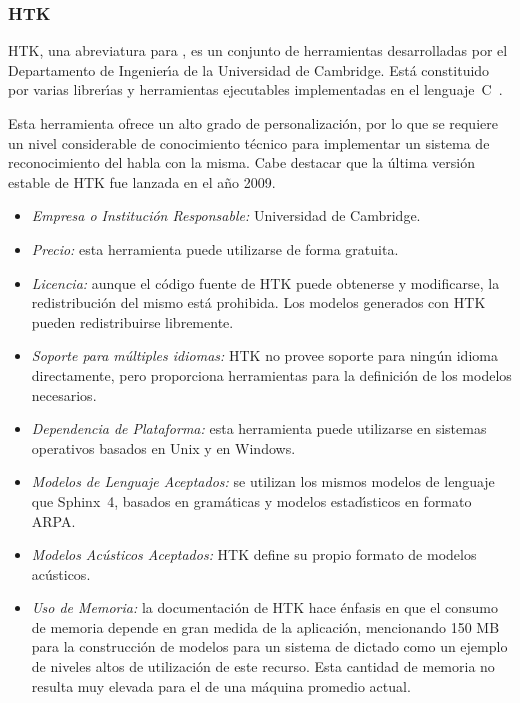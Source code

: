 \subsubsection{HTK}
\label{sec:htk}

HTK, una abreviatura para , es un conjunto de herramientas
desarrolladas por el Departamento de Ingenier{\'\i}a de la Universidad de Cambridge. Est\'a constituido
por varias librer{\'\i}as y herramientas ejecutables implementadas en el \mbox{lenguaje C \cite{HTKHomePage}}.

Esta herramienta ofrece un alto grado de personalizaci\'on, por lo que se requiere un nivel considerable
de conocimiento t\'ecnico para implementar un sistema de reconocimiento del habla con la misma.
Cabe destacar que la \'ultima versi\'on estable de HTK fue lanzada en el a\~no 2009.

\begin{itemize}
	\item \emph{Empresa o Instituci\'on Responsable:} Universidad de Cambridge.
	\item \emph{Precio:} esta herramienta puede utilizarse de forma gratuita.
	\item \emph{Licencia:} aunque el c\'odigo fuente de HTK puede obtenerse y modificarse,
	la redistribuci\'on del mismo est\'a prohibida. Los modelos generados con HTK pueden
	redistribuirse libremente.
	\item \emph{Soporte para m\'ultiples idiomas:} HTK no provee soporte para ning\'un
	idioma directamente, pero proporciona herramientas para la definici\'on de los modelos necesarios.
	\item \emph{Dependencia de Plataforma:} esta herramienta puede utilizarse en sistemas operativos
	basados en Unix y en Windows.
	\item \emph{Modelos de Lenguaje Aceptados:} se utilizan los mismos modelos de lenguaje que \mbox{Sphinx 4},
	basados en gram\'aticas y modelos estad{\'\i}sticos en formato ARPA.
	\item \emph{Modelos Ac\'usticos Aceptados:} HTK define su propio formato de modelos ac\'usticos.
	\item \emph{Uso de Memoria:} la documentaci\'on de HTK hace \'enfasis en que el consumo de memoria depende en
	gran medida de la aplicaci\'on, mencionando 150 MB para la construcci\'on de modelos para un sistema de
	dictado como un ejemplo de niveles altos de utilizaci\'on de este recurso.
	Esta cantidad de memoria no resulta muy elevada para el  de una m\'aquina promedio actual.
\end{itemize}